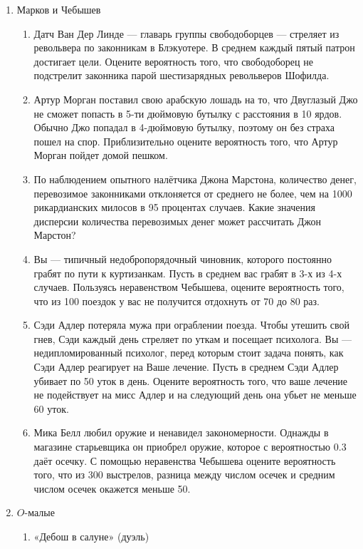 \documentclass[11pt, a4paper]{article}
\theoremstyle{definition}
\begin{document}
\begin{enumerate}
\begin{enumerate}
\end{enumerate}    
    
    \item Марков и Чебышев
\begin{enumerate}
    \item Датч Ван Дер Линде — главарь группы свободоборцев — стреляет из револьвера по законникам в Блэкуотере. В среднем каждый пятый патрон достигает цели. Оцените вероятность того, что свободоборец не подстрелит законника парой  шестизарядных револьверов Шофилда.
    \item Артур Морган поставил свою арабскую лошадь на то, что Двуглазый Джо не сможет попасть в 5-ти дюймовую бутылку с расстояния в 10 ярдов. Обычно Джо попадал в 4-дюймовую бутылку, поэтому он без страха пошел на спор. Приблизительно оцените вероятность того, что Артур Морган пойдет домой пешком.%
    \item По наблюдением опытного налётчика Джона Марстона, количество денег, перевозимое законниками отклоняется от среднего не более, чем на 1000 рикардианских милосов в 95 процентах случаев. Какие значения дисперсии количества перевозимых денег может рассчитать Джон Марстон?
    \item Вы — типичный недобропорядочный чиновник, которого постоянно грабят по пути к куртизанкам. Пусть в среднем вас грабят в 3-х из 4-х случаев. Пользуясь неравенством Чебышева, оцените вероятность того, что из 100 поездок у вас не получится отдохнуть от 70 до 80 раз.  
    \item Сэди Адлер потеряла мужа при ограблении поезда. Чтобы утешить свой гнев, Сэди каждый день стреляет по уткам и посещает психолога.
    Вы — недипломированный психолог, перед которым стоит задача понять, как Сэди Адлер реагирует на Ваше лечение. Пусть
    в среднем Сэди Адлер убивает по 50 уток в день. Оцените вероятность того, что ваше лечение не подействует на мисс Адлер и на следующий день она убьет 
    не меньше 60 уток.
    \item Мика Белл любил оружие и ненавидел закономерности. Однажды в магазине старьевщика он приобрел оружие, которое с вероятностью 0.3 даёт осечку.
    С помощью неравенства Чебышева оцените вероятность того, что из 300 выстрелов, разница между числом осечек и средним числом осечек окажется меньше 50.
\end{enumerate}    
    \newpage
    \item $O$-малые
\begin{enumerate}
    \item «Дебош в салуне» (дуэль)
    

\end{enumerate}
\end{enumerate}
\end{document}
